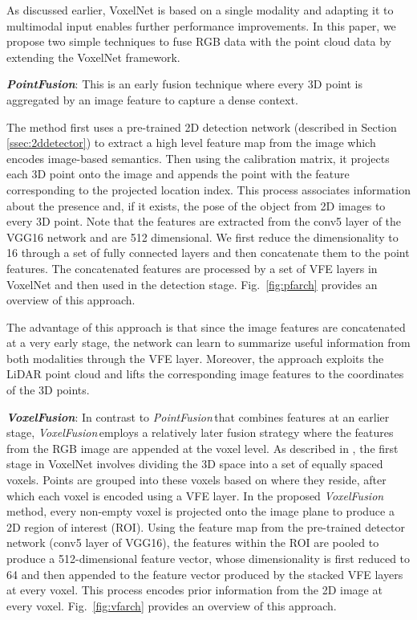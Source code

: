 \documentclass[letterpaper, 10 pt, conference]{ieeeconf}
\newcommand{\PF}{\textit{PointFusion}}
\newcommand{\VF}{\textit{VoxelFusion}}
\begin{document}
As discussed earlier, VoxelNet \cite{REF:zhou2017voxelnet} is based on a single modality and adapting it to multimodal input enables further performance improvements. In this paper, we propose two simple techniques to fuse RGB data with the point cloud data by extending the VoxelNet framework. 

\noindent\textbf{\PF}: This is an early fusion technique where every 3D point is aggregated by an image feature to capture a dense context.

The method first uses a pre-trained 2D detection network (described in Section \ref{ssec:2ddetector}) to extract a high level feature map from the image which encodes image-based semantics. Then using the calibration matrix, it projects each 3D point onto the image and appends the point with the feature corresponding to the projected location index. This process associates information about the presence and, if it exists, the pose of the object from 2D images to every 3D point. Note that the features are extracted from the conv5 layer of the VGG16 network and are 512 dimensional. We first reduce the dimensionality to 16 through a set of fully connected layers and then concatenate them to the point features. The concatenated features are processed by a set of VFE layers in VoxelNet and then used in the detection stage. Fig.~\ref{fig:pfarch} provides an overview of this approach. 

The advantage of this approach is that since the image features are concatenated at a very early stage, the network can learn to summarize useful information from both modalities through the VFE layer. Moreover, the approach exploits the LiDAR point cloud and lifts the corresponding image features to the coordinates of the 3D points.


\noindent\textbf{\VF}: In contrast to \PF{\,}that combines features at an earlier stage, \VF{\,}employs a relatively later fusion strategy where the features from the RGB image are appended at the voxel level. As described in \cite{REF:zhou2017voxelnet}, the first stage in VoxelNet involves dividing the 3D space into a set of equally spaced voxels. Points are grouped into these voxels based on where they reside, after which each voxel is encoded using a VFE layer. In the proposed \VF{\,}method, every non-empty voxel is projected onto the image plane to produce a 2D region of interest (ROI). Using the feature map from the pre-trained detector network (conv5 layer of VGG16), the features within the ROI are pooled to produce a 512-dimensional feature vector, whose dimensionality is first reduced to 64 and then appended to the feature vector produced by the stacked VFE layers at every voxel. This process encodes prior information from the 2D image at every voxel. Fig.~\ref{fig:vfarch} provides an overview of this approach.
\end{document}
